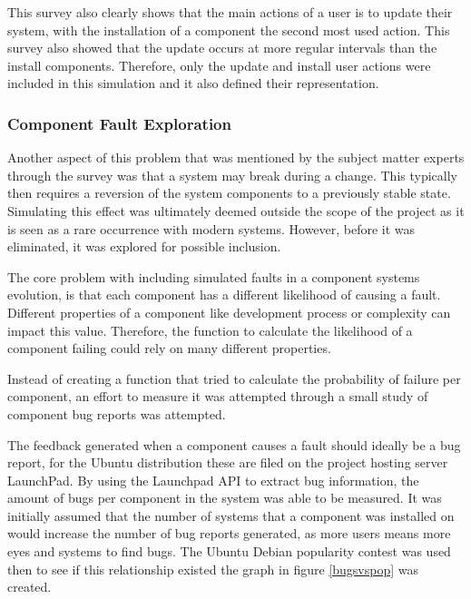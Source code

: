 This survey also clearly shows that the main actions of a user is to update their system,
with the installation of a component the second most used action.
This survey also showed that the update occurs at more regular intervals than the install components.
Therefore, only the update and install user actions were included in this simulation and it also defined their representation. 

\subsubsection{Component Fault Exploration}
Another aspect of this problem that was mentioned by the subject matter experts through the survey was that a system may break during a change.
This typically then requires a reversion of the system components to a previously stable state.
Simulating this effect was ultimately deemed outside the scope of the project as it is seen as a rare occurrence with modern systems.
However, before it was eliminated, it was explored for possible inclusion.

The core problem with including simulated faults in a component systems evolution, is that each component has a different likelihood of causing a fault.
Different properties of a component like development process or complexity can impact this value.
Therefore, the function to calculate the likelihood of a component failing could rely on many different properties.

Instead of creating a function that tried to calculate the probability of failure per component,
an effort to measure it was attempted through a small study of component bug reports was attempted.

The feedback generated when a component causes a fault should ideally be a bug report, for the Ubuntu distribution these are filed on the project hosting server LaunchPad.
By using the Launchpad API to extract bug information, the amount of bugs per component in the system was able to be measured.
It was initially assumed that the number of systems that a component was installed on would increase the number of bug reports generated,
as more users means more eyes and systems to find bugs.
The Ubuntu Debian popularity contest was used then to see if this relationship existed the graph in figure \ref{bugsvspop} was created.

